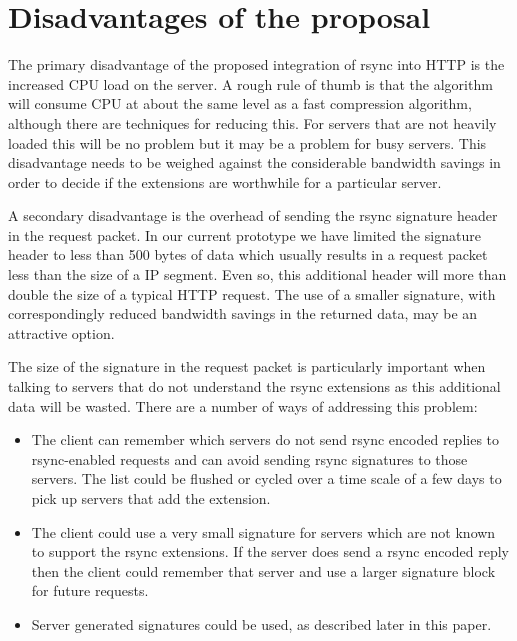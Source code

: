 \documentclass[a4paper]{article}
\begin{document}
\section*{Disadvantages of the proposal}

The primary disadvantage of the proposed integration of rsync into
HTTP is the increased CPU load on the server. A rough rule of thumb is
that the algorithm will consume CPU at about the same level as a fast
compression algorithm, although there are techniques for reducing
this.  For servers that are not heavily loaded this will be no problem
but it may be a problem for busy servers. This disadvantage needs to
be weighed against the considerable bandwidth savings in order to
decide if the extensions are worthwhile for a particular server.

A secondary disadvantage is the overhead of sending the rsync
signature header in the request packet. In our current prototype we
have limited the signature header to less than 500 bytes of data which
usually results in a request packet less than the size of a IP
segment. Even so, this additional header will more than double the
size of a typical HTTP request. The use of a smaller signature, with
correspondingly reduced bandwidth savings in the returned data, may be
an attractive option.

The size of the signature in the request packet is particularly
important when talking to servers that do not understand the rsync
extensions as this additional data will be wasted. There are a number
of ways of addressing this problem:

\begin{itemize}
\item The client can remember which servers do not send rsync encoded
  replies to rsync-enabled requests and can avoid sending rsync
  signatures to those servers. The list could be flushed or cycled
  over a time scale of a few days to pick up servers that add the
  extension.

\item The client could use a very small signature for servers which
  are not known to support the rsync extensions. If the server does
  send a rsync encoded reply then the client could remember that
  server and use a larger signature block for future requests.

\item Server generated signatures could be used, as described later in
  this paper.
\end{itemize}
\end{document}
